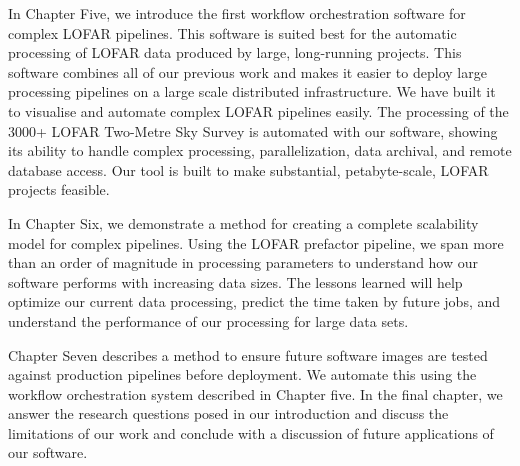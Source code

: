In Chapter Five, we introduce the first workflow orchestration software for complex LOFAR pipelines. This software is suited best for the automatic processing of LOFAR data produced by large, long-running projects. This software combines all of our previous work and makes it easier to deploy large processing pipelines on a large scale distributed infrastructure. We have built it to visualise and automate complex LOFAR pipelines easily. The processing of the 3000+ LOFAR Two-Metre Sky Survey is automated with our software, showing its ability to handle complex processing, parallelization, data archival, and remote database access. Our tool is built to make substantial, petabyte-scale, LOFAR projects feasible.

In Chapter Six, we demonstrate a method for creating a complete scalability model for complex pipelines. Using the LOFAR prefactor pipeline, we span more than an order of magnitude in processing parameters to understand how our software performs with increasing data sizes. The lessons learned will help optimize our current data processing, predict the time taken by future jobs, and understand the performance of our processing for large data sets. 

Chapter Seven describes a method to ensure future software images are tested against production pipelines before deployment. We automate this using the workflow orchestration system described in Chapter five. In the final chapter, we answer the research questions posed in our introduction and discuss the limitations of our work and conclude with a discussion of future applications of our software.  
